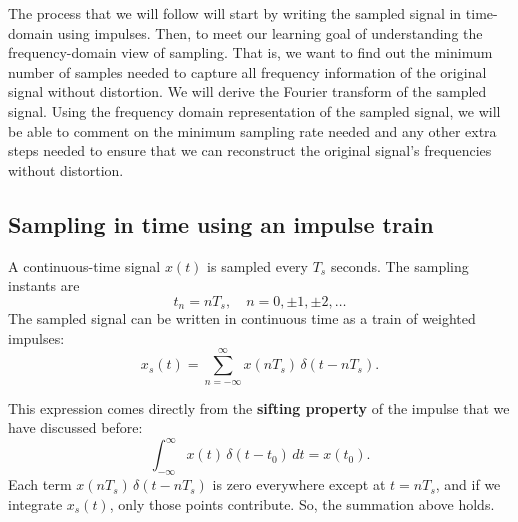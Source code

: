 
The process that we will follow will start by writing the sampled signal in time-domain using impulses. Then, to meet our learning goal of understanding the frequency-domain view of sampling. That is, we want to find out the minimum number of samples needed to capture all frequency information of the original signal without distortion. We will derive the Fourier transform of the sampled signal. Using the frequency domain representation of the sampled signal, we will be able to comment on the minimum sampling rate needed and any other extra steps needed to ensure that we can reconstruct the original signal's frequencies without distortion.

\subsection{Sampling in time using an impulse train}

A continuous-time signal $x(t)$ is sampled every $T_s$ seconds. The sampling instants
are
\[
t_n = nT_s, \quad n = 0, \pm 1, \pm 2, \dots
\]
The sampled signal can be written in continuous time as a train of weighted impulses:
\begin{equation}
x_s(t) = \sum_{n=-\infty}^{\infty} x(nT_s)\,\delta(t - nT_s).
\label{eq:sampling_time_domain}
\end{equation}


This expression comes directly from the \textbf{sifting property} of the impulse that we have discussed before:
\[
\int_{-\infty}^{\infty} x(t)\,\delta(t - t_0)\,dt = x(t_0).
\]
Each term $x(nT_s)\,\delta(t - nT_s)$ is zero everywhere except at $t = nT_s$, and
if we integrate $x_s(t)$, only those points contribute. So, the summation above holds.

